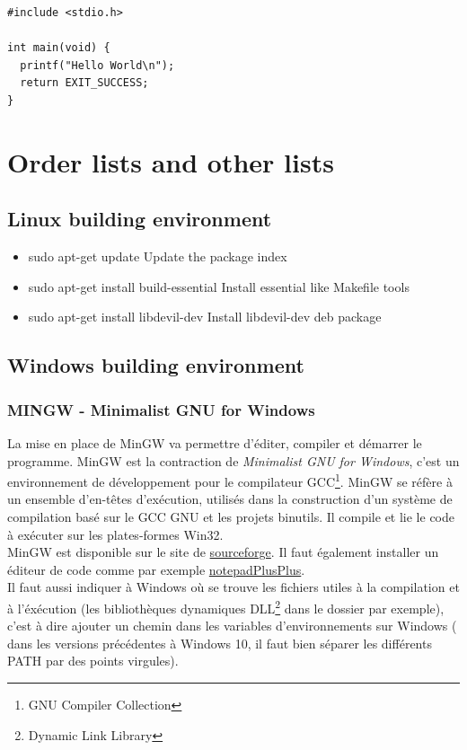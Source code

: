 \documentclass[12pt]{article}
\begin{document}
 
\begin{lstlisting}
#include <stdio.h>
 
int main(void) {
  printf("Hello World\n");
  return EXIT_SUCCESS;
}
\end{lstlisting}

\newpage
\section{Order lists and other lists}

\subsection{Linux building environment}
\begin{itemize} [label=\textbullet, font=\small \color{blue}]
\item sudo apt-get update \tabto{8cm} Update the package index
\item sudo apt-get install build-essential  \tabto{8cm} Install essential like Makefile tools
\item sudo apt-get install libdevil-dev \tabto{8cm} Install libdevil-dev deb package


\end{itemize}

\subsection{Windows building environment}

\subsubsection{MINGW - Minimalist GNU for Windows}
La mise en place de MinGW\cite{MinGW} va permettre d'éditer, compiler et démarrer le programme. MinGW est la contraction de \emph{Minimalist GNU for Windows}, c'est un environnement de développement pour le compilateur GCC\footnote{GNU Compiler Collection}. MinGW se réfère à un ensemble d’en-têtes d’exécution, utilisés dans la construction d’un système de compilation basé sur le GCC GNU et les projets binutils. Il compile et lie le code à exécuter sur les plates-formes Win32\cite{MinGW}. \\
MinGW est disponible sur le site de \href{https://sourceforge.net/projects/mingw/}{sourceforge}. Il faut également installer un éditeur de code comme par exemple \href{https://notepad-plus-plus.org/download/v7.6.3.html}{notepadPlusPlus}.\\
Il faut aussi indiquer à Windows où se trouve les fichiers utiles à la compilation et à l'éxécution (les bibliothèques dynamiques DLL\footnote{Dynamic Link Library} dans le dossier  par exemple), c'est à dire ajouter un chemin dans les variables d'environnements sur Windows ( dans les versions précédentes à Windows 10, il faut bien séparer les différents PATH par des points virgules)\cite{Champagne}.\\
\end{document}
